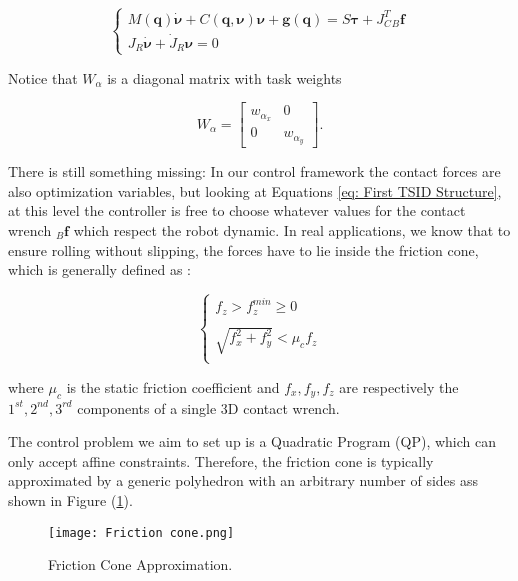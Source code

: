 \begin{equation}
\begin{cases}
        M(\mathbf{q})\dot{\bm{\nu}} + C(\mathbf{q},\bm{\nu})\bm{\nu} + \mathbf{g}(\mathbf{q}) = S\bm{\tau} + J^{T}_{C} {}_{B}\mathbf{f} \\
        J_{R}\bm{\dot{\nu}} + \dot{J}_R\bm{\nu} = 0
\end{cases}
\label{eq: First TSID Structure}
\end{equation}

Notice that $W_{\alpha}$ is a diagonal matrix with task weights 

\begin{equation*}
    W_{\alpha} = \begin{bmatrix}
        w_{\alpha_x} & 0 \\
        0 & w_{\alpha_y}
    \end{bmatrix}.
\end{equation*}

There is still something missing:
In our control framework the contact forces are also optimization variables, but looking at Equations \eqref{eq: First TSID Structure}, at this level the controller is free to choose whatever values for the contact wrench ${}_{B}\mathbf{f}$ which respect the robot dynamic.
In real applications, we know that to ensure rolling without slipping, the forces have to lie inside the friction cone, which is generally defined as \cite{Pretorius-et-al}:

\begin{equation}
\begin{cases}
  f_z > f_z^{min} \geq 0\\
\\
 \sqrt{f_x ^{2} + f_y ^{2}} < \mu_c f_z \\
\end{cases}
\label{eq:nonlinear friction cone}
\end{equation}

where $\mu_c$ is the static friction coefficient and $f_x, f_y, f_z$ are respectively the $1^{st}, 2^{nd}, 3^{rd}$ components of a single 3D contact wrench.

The control problem we aim to set up is a Quadratic Program (QP), which can only accept affine constraints. Therefore, the friction cone is typically approximated by a generic polyhedron with an arbitrary number of sides ass shown in Figure (\ref{fig:Friction Cone Approximation}).

\begin{figure}
    \centering
    \texttt{[image: Friction cone.png]}
    \caption{Friction Cone Approximation.}
    \label{fig:Friction Cone Approximation}
\end{figure}

